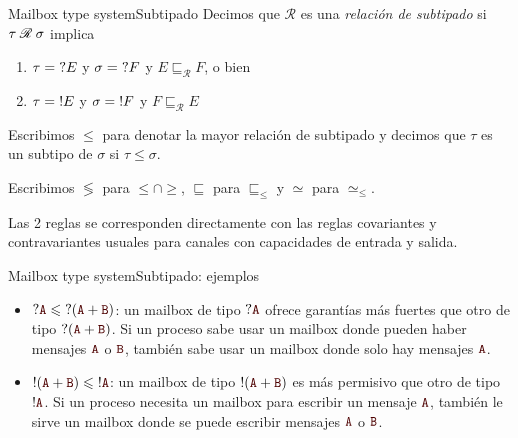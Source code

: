 \documentclass{beamer}
\newcommand{\msgtag}[1]{\texttt{\textcolor{msg-color}{#1}}}
\begin{document}
\begin{frame}{Mailbox type system}{Subtipado}
    Decimos que $\mathscr{R}$ es una \emph{relación de subtipado} si $\tau \hspace{0.25em} \mathscr{R} \hspace{0.25em} \sigma$ implica
    \begin{enumerate}
        \item $\tau = \hspace{0.3em} ?E$ y $\sigma = \hspace{0.3em} ?F$ y $E \sqsubseteq_\mathscr{R} F$, o bien
        \item $\tau = \hspace{0.3em} !E$ y $\sigma = \hspace{0.3em} !F$ y $F \sqsubseteq_\mathscr{R} E$
    \end{enumerate}
    \vspace{1em}

    Escribimos $\leqslant$ para denotar la mayor relación de subtipado y decimos que $\tau$ es un subtipo de $\sigma$ si $\tau \leqslant \sigma$.
    \vspace{1em}

    Escribimos $\lessgtr$ para $\leqslant \cap \geqslant$, $\sqsubseteq$ para $\sqsubseteq_{\leqslant}$ y $\simeq$ para $\simeq_{\leqslant}$.
    \vspace{1em}

    Las 2 reglas se corresponden directamente con las reglas covariantes y contravariantes usuales para canales con capacidades de entrada y salida.
\end{frame}

\begin{frame}{Mailbox type system}{Subtipado: ejemplos}
    \begin{itemize}
        \item $?\msgtag{A} \leqslant \hspace{0.3em} ?(\msgtag{A} + \msgtag{B})$: un mailbox de tipo $?\msgtag{A}$ ofrece garantías más fuertes que otro de tipo $?(\msgtag{A} + \msgtag{B})$. Si un proceso sabe usar un mailbox donde pueden haber mensajes $\msgtag{A}$ o $\msgtag{B}$, también sabe usar un mailbox donde solo hay mensajes $\msgtag{A}$.
        \item $!(\msgtag{A} + \msgtag{B}) \leqslant \hspace{0.3em} !\msgtag{A}$: un mailbox de tipo $!(\msgtag{A} + \msgtag{B})$ es más permisivo que otro de tipo $!\msgtag{A}$. Si un proceso necesita un mailbox para escribir un mensaje $\msgtag{A}$, también le sirve un mailbox donde se puede escribir mensajes $\msgtag{A}$ o $\msgtag{B}$.
    \end{itemize}
\end{frame}
\end{document}

